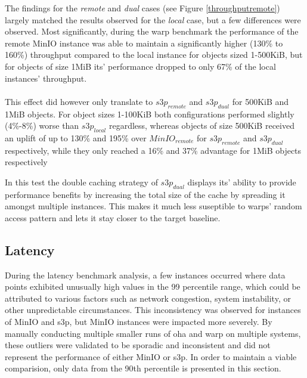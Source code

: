 The findings for the \textit{remote} and \textit{dual} cases (see Figure \ref{throughputremote}) largely matched the results observed for the \textit{local} case, but a few differences were observed. 
Most significantly, during the warp benchmark the performance of the remote MinIO instance was able to maintain a significantly higher (130\% to 160\%) throughput compared to the local instance for objects sized 1-500KiB, but for objects of size 1MiB its' performance dropped to only 67\% of the local instances' throughput.
\\\\
This effect did however only translate to ${s3p}_{remote}$ and ${s3p}_{dual}$ for 500KiB and 1MiB objects. For object sizes 1-100KiB both configurations performed slightly (4\%-8\%) worse than ${s3p}_{local}$ regardless, whereas objects of size 500KiB received an uplift of up to 130\% and 195\% over ${MinIO}_{remote}$ for ${s3p}_{remote}$ and ${s3p}_{dual}$ respectively, while they only reached a 16\% and 37\% advantage for 1MiB objects respectively

In this test the double caching strategy of ${s3p}_{dual}$ displays its' ability to provide performance benefits by increasing the total size of the cache by spreading it amongst multiple instances. This makes it much less suseptible to warps' random access pattern and lets it stay closer to the target baseline.

\subsection{Latency}


During the latency benchmark analysis, a few instances occurred where data points exhibited unusually high values in the 99 percentile range, which could be attributed to various factors such as network congestion, system instability, or other unpredictable circumstances. This inconsistency was observed for instances of MinIO and s3p, but MinIO instances were impacted more severely. By manually conducting multiple smaller runs of oha and warp on multiple systems, these outliers were validated to be sporadic and inconsistent and did not represent the performance of either MinIO or s3p. In order to maintain a viable comparision, only data from the 90th percentile is presented in this section.

\latlocalminio
{}\latlocalminiooha


